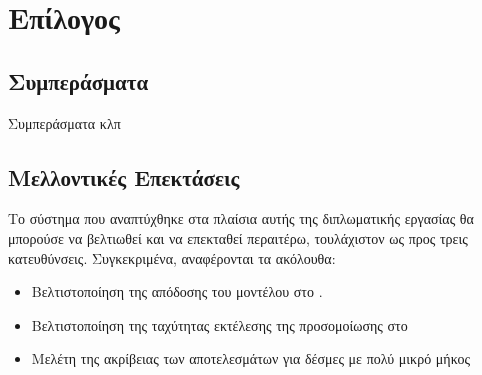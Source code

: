 \chapter{Επίλογος}

\section{Συμπεράσματα}
Συμπεράσματα κλπ

\section{Μελλοντικές Επεκτάσεις}
Το σύστημα που αναπτύχθηκε στα πλαίσια αυτής της διπλωματικής
εργασίας θα μπορούσε να βελτιωθεί και να επεκταθεί περαιτέρω,
τουλάχιστον ως προς τρεις κατευθύνσεις. Συγκεκριμένα, αναφέρονται
τα ακόλουθα:

\begin{itemize}
\item Βελτιστοποίηση της απόδοσης του μοντέλου στο .
\item Βελτιστοποίηση της ταχύτητας εκτέλεσης της προσομοίωσης στο 
\item Μελέτη της ακρίβειας των αποτελεσμάτων για δέσμες με πολύ μικρό μήκος
\end{itemize}
